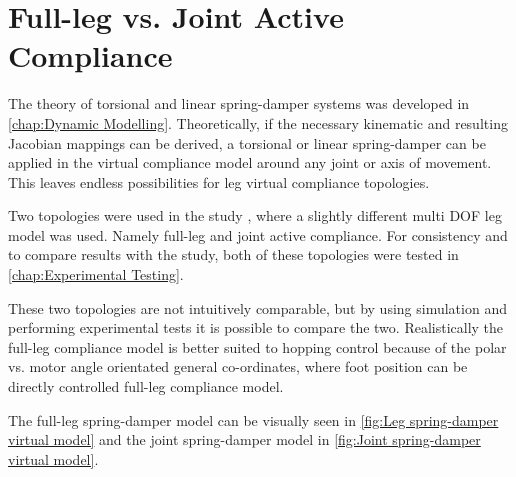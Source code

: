 \section{Full-leg vs. Joint Active Compliance}

The theory of torsional and linear spring-damper systems was developed in \cref{chap:Dynamic Modelling}. Theoretically, if the necessary kinematic and resulting Jacobian mappings can be derived, a torsional or linear spring-damper can be applied in the virtual compliance model around any joint or axis of movement. This leaves endless possibilities for leg virtual compliance topologies.

Two topologies were used in the study \cite{Kalouche2016}, where a slightly different multi DOF leg model was used. Namely full-leg and joint active compliance. For consistency and to compare results with the study, both of these topologies were tested in \cref{chap:Experimental Testing}. 

These two topologies are not intuitively comparable, but by using simulation and performing experimental tests it is possible to compare the two. Realistically the full-leg compliance model is better suited to hopping control because of the polar vs. motor angle orientated general co-ordinates, where foot position can be directly controlled full-leg compliance model.

The full-leg spring-damper model can be visually seen in \cref{fig:Leg spring-damper virtual model} and the joint spring-damper model in \cref{fig:Joint spring-damper virtual model}.

